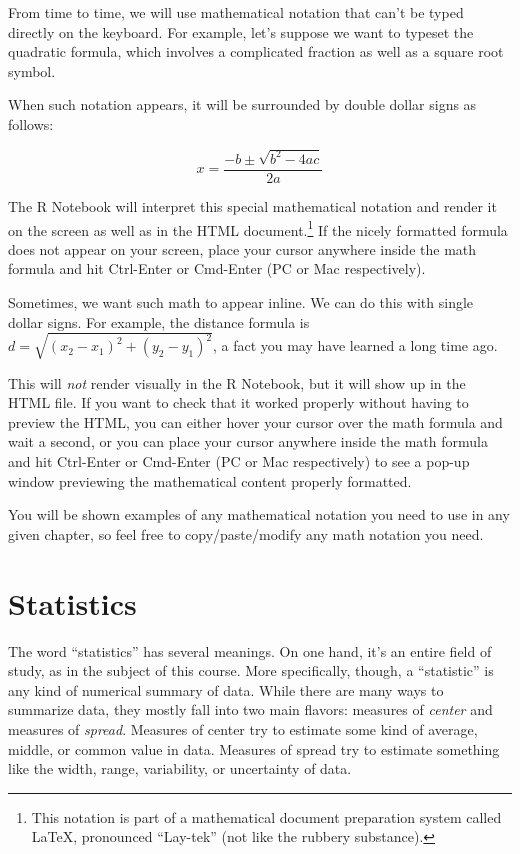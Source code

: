 \documentclass[
]{book}
\begin{document}
From time to time, we will use mathematical notation that can't be typed directly on the keyboard. For example, let's suppose we want to typeset the quadratic formula, which involves a complicated fraction as well as a square root symbol.

When such notation appears, it will be surrounded by double dollar signs as follows:

\[
x = \frac{-b \pm \sqrt{b^{2} - 4ac}}{2a}
\]

The R Notebook will interpret this special mathematical notation and render it on the screen as well as in the HTML document.\footnote{This notation is part of a mathematical document preparation system called LaTeX, pronounced ``Lay-tek'' (not like the rubbery substance).} If the nicely formatted formula does not appear on your screen, place your cursor anywhere inside the math formula and hit Ctrl-Enter or Cmd-Enter (PC or Mac respectively).

Sometimes, we want such math to appear inline. We can do this with single dollar signs. For example, the distance formula is \(d = \sqrt{(x_{2} - x_{1})^{2} + (y_{2} - y_{1})^{2}}\), a fact you may have learned a long time ago.

This will \emph{not} render visually in the R Notebook, but it will show up in the HTML file. If you want to check that it worked properly without having to preview the HTML, you can either hover your cursor over the math formula and wait a second, or you can place your cursor anywhere inside the math formula and hit Ctrl-Enter or Cmd-Enter (PC or Mac respectively) to see a pop-up window previewing the mathematical content properly formatted.

You will be shown examples of any mathematical notation you need to use in any given chapter, so feel free to copy/paste/modify any math notation you need.

\hypertarget{numerical-statistics}{%
\section{Statistics}\label{numerical-statistics}}

The word ``statistics'' has several meanings. On one hand, it's an entire field of study, as in the subject of this course. More specifically, though, a ``statistic'' is any kind of numerical summary of data. While there are many ways to summarize data, they mostly fall into two main flavors: measures of \emph{center} and measures of \emph{spread}. Measures of center try to estimate some kind of average, middle, or common value in data. Measures of spread try to estimate something like the width, range, variability, or uncertainty of data.
\end{document}
